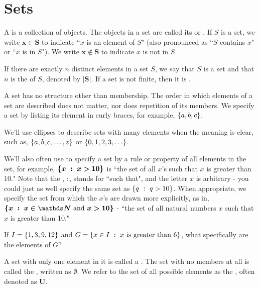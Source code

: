 \section{Sets}

\begin{defn}[Sets]
A  is a collection of objects. The objects in a set are called its  or . If $S$ is a set, we write $\bm{x \in S}$ to indicate ``$x$ is an element of $S$" (also pronounced as ``$S$ contains $x$" or ``$x$ is in $S$"). We write $\bm{x \notin S}$ to indicate $x$ is not in $S$.

If there are exactly $n$ distinct elements in a set $S$, we say that $S$ is a  set and that $n$ is the  of $S$, denoted by $\bm{|S|}$. If a set is not finite, then it is .
\end{defn}

\begin{discussion}
A set has no structure other than membership. The order in which elements of a set are described does not matter, nor does repetition of its members. We specify a set by listing its element in curly braces, for example, $\left\lbrace a, b, c \right\rbrace$. 

We'll use ellipses to describe sets with many elements when the meaning is clear, such as, $\left\lbrace a, b, c, \ldots, z \right\rbrace$ or $\left\lbrace 0, 1, 2, 3, \ldots \right\rbrace$. 

We'll also often use  to specify a set by a rule or property of all elements in the set, for example, $\bm{\left\lbrace x\ :\ x > 10 \right\rbrace}$  is ``the set of all $x$'s such that $x$ is greater than 10." Note that the \setbuildsepname, $:$, stands for ``such that", and the letter $x$ is arbitrary - you could just as well specify the same set as $\left\lbrace q\ :\ q > 10 \right\rbrace$. When appropriate, we specify the set from which the $x$'s are drawn more explicitly, as in, $\bm{\setbuild{x}{x \in \naturals~\textrm{and}~x > 10}}$ - ``the set of all natural numbers $x$ such that $x$ is greater than 10."
\end{discussion}

\begin{exer}
If $I = \left\lbrace 1, 3, 9, 12 \right\rbrace$ and $G = \left\lbrace x \in I\ :\ x~\textrm{is greater than 6} \right\rbrace$, what specifically are the elements of $G$?
\end{exer}

\begin{defn}
A set with only one element in it is called a . The set with no members at all is called the , written as $\bm{\emptyset}$. We refer to the set of all possible elements as the , often denoted as $\bm U$.
\end{defn}

